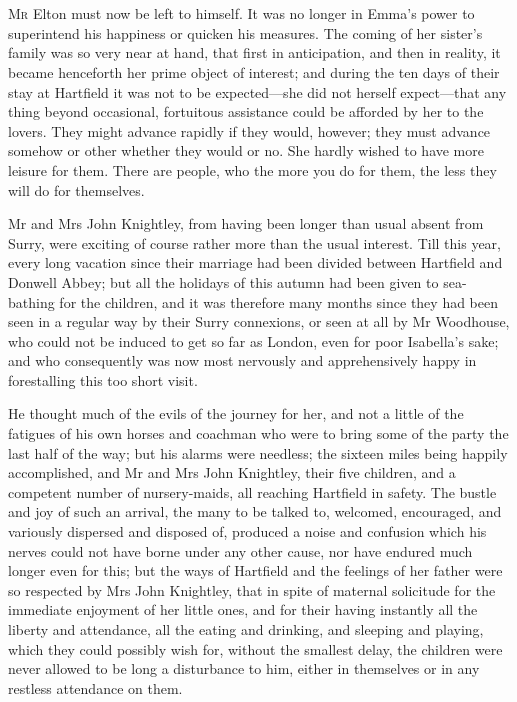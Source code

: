 \chapter[Chapter \thechapter]{}
\lettrine[lines=4,lraise=0.3]{M}{r} Elton must now be left to himself. It was no longer in Emma's power to superintend his happiness or quicken his measures. The coming of her sister's family was so very near at hand, that first in anticipation, and then in reality, it became henceforth her prime object of interest; and during the ten days of their stay at Hartfield it was not to be expected—she did not herself expect—that any thing beyond occasional, fortuitous assistance could be afforded by her to the lovers. They might advance rapidly if they would, however; they must advance somehow or other whether they would or no. She hardly wished to have more leisure for them. There are people, who the more you do for them, the less they will do for themselves.

Mr and Mrs John Knightley, from having been longer than usual absent from Surry, were exciting of course rather more than the usual interest. Till this year, every long vacation since their marriage had been divided between Hartfield and Donwell Abbey; but all the holidays of this autumn had been given to sea-bathing for the children, and it was therefore many months since they had been seen in a regular way by their Surry connexions, or seen at all by Mr Woodhouse, who could not be induced to get so far as London, even for poor Isabella's sake; and who consequently was now most nervously and apprehensively happy in forestalling this too short visit.

He thought much of the evils of the journey for her, and not a little of the fatigues of his own horses and coachman who were to bring some of the party the last half of the way; but his alarms were needless; the sixteen miles being happily accomplished, and Mr and Mrs John Knightley, their five children, and a competent number of nursery-maids, all reaching Hartfield in safety. The bustle and joy of such an arrival, the many to be talked to, welcomed, encouraged, and variously dispersed and disposed of, produced a noise and confusion which his nerves could not have borne under any other cause, nor have endured much longer even for this; but the ways of Hartfield and the feelings of her father were so respected by Mrs John Knightley, that in spite of maternal solicitude for the immediate enjoyment of her little ones, and for their having instantly all the liberty and attendance, all the eating and drinking, and sleeping and playing, which they could possibly wish for, without the smallest delay, the children were never allowed to be long a disturbance to him, either in themselves or in any restless attendance on them.

